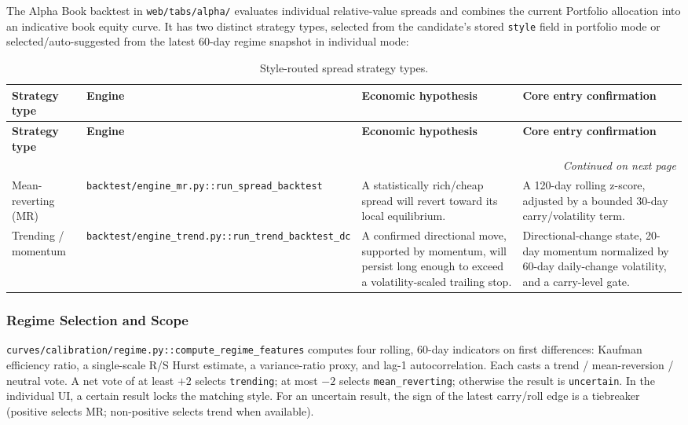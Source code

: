 The Alpha Book backtest in \texttt{web/tabs/alpha/} evaluates individual relative-value
spreads and combines the current Portfolio allocation into an indicative book
equity curve. It has two distinct strategy types, selected from the candidate's
stored \texttt{style} field in portfolio mode or selected/auto-suggested from the latest
60-day regime snapshot in individual mode:

{\small
\setlength{\LTleft}{0pt}
\setlength{\LTright}{0pt}
\setlength{\tabcolsep}{5pt}
\renewcommand{\arraystretch}{1.15}
\begin{longtable}{p{} p{} p{} p{}}
\caption{Style-routed spread strategy types.}\label{tab:pairs-strategy-types-overleaf} \\
\hline
\textbf{Strategy type} & \textbf{Engine} & \textbf{Economic hypothesis} & \textbf{Core entry confirmation} \\
\hline
\endfirsthead
\hline
\textbf{Strategy type} & \textbf{Engine} & \textbf{Economic hypothesis} & \textbf{Core entry confirmation} \\
\hline
\endhead
\hline
\multicolumn{4}{r}{\textit{Continued on next page}} \\
\hline
\endfoot
\hline
\endlastfoot
Mean-reverting (MR) & \texttt{backtest/engine\_mr.py::run\_spread\_backtest} & A statistically rich/cheap spread will revert toward its local equilibrium. & A 120-day rolling z-score, adjusted by a bounded 30-day carry/volatility term. \\
Trending / momentum & \texttt{backtest/engine\_trend.py::run\_trend\_backtest\_dc} & A confirmed directional move, supported by momentum, will persist long enough to exceed a volatility-scaled trailing stop. & Directional-change state, 20-day momentum normalized by 60-day daily-change volatility, and a carry-level gate. \\
\end{longtable}
}

\subsubsection{Regime Selection and Scope}

\texttt{curves/calibration/regime.py::compute\_regime\_features} computes four rolling,
60-day indicators on first differences: Kaufman efficiency ratio, a single-scale
R/S Hurst estimate, a variance-ratio proxy, and lag-1 autocorrelation. Each casts a
trend / mean-reversion / neutral vote. A net vote of at least $+2$ selects
\texttt{trending}; at most $-2$ selects \texttt{mean\_reverting}; otherwise the result is
\texttt{uncertain}. In the individual UI, a certain result locks the matching style. For
an uncertain result, the sign of the latest carry/roll edge is a tiebreaker
(positive selects MR; non-positive selects trend when available).


